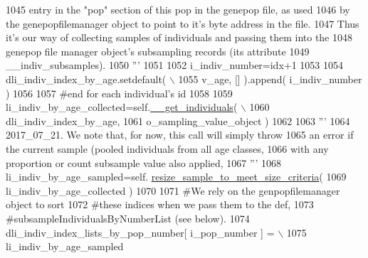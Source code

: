\begin{DoxyCode}
1045 \textcolor{stringliteral}{                        entry in the "pop" section of this pop in the genepop file, as used}
1046 \textcolor{stringliteral}{                        by the genepopfilemanager object to point to it's byte address in the file.}
1047 \textcolor{stringliteral}{                        Thus it's our way of collecting samples of individuals and passing them into the}
1048 \textcolor{stringliteral}{                        genepop file manager object's subsampling records (its attribute }
1049 \textcolor{stringliteral}{                        \_\_indiv\_subsamples).}
1050 \textcolor{stringliteral}{                        '''}
1051 
1052                         i\_indiv\_number=idx+1
1053 
1054                         dli\_indiv\_index\_by\_age.setdefault( \(\backslash\)
1055                                     v\_age, [] ).append( i\_indiv\_number ) 
1056 
1057                     \textcolor{comment}{#end for each individual's id   }
1058 
1059                     li\_indiv\_by\_age\_collected=self.\hyperlink{classnegui_1_1genepopfilesampler_1_1GenepopFileSamplerCohorts_a1b370307615aa6267a6f287180030058}{\_\_get\_individuals}( \(\backslash\)
1060                                                     dli\_indiv\_index\_by\_age,
1061                                                     o\_sampling\_value\_object ) 
1062                 
1063                     \textcolor{stringliteral}{'''}
1064 \textcolor{stringliteral}{                    2017\_07\_21.  We note that, for now, this call will simply throw }
1065 \textcolor{stringliteral}{                    an error if the current sample (pooled individuals from all age classes,}
1066 \textcolor{stringliteral}{                    with any proportion or count subsample value also applied,}
1067 \textcolor{stringliteral}{                    '''}
1068                     li\_indiv\_by\_age\_sampled=self.
      \hyperlink{classnegui_1_1genepopfilesampler_1_1GenepopFileSamplerCohorts_a765e68f8d835bde418cd8c3005b0a97a}{resize\_sample\_to\_meet\_size\_criteria}( 
1069                                                                 li\_indiv\_by\_age\_collected ) 
1070 
1071                     \textcolor{comment}{#We rely on the genpopfilemanager object to sort }
1072                     \textcolor{comment}{#these indices when we pass them to the def,}
1073                     \textcolor{comment}{#subsampleIndividualsByNumberList (see below).}
1074                     dli\_indiv\_index\_lists\_by\_pop\_number[ i\_pop\_number ] = \(\backslash\)
1075                                                         li\_indiv\_by\_age\_sampled

\end{DoxyCode}
